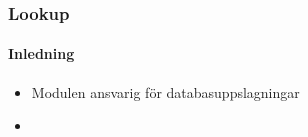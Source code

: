 \begin{frame}
  \frametitle{Lookup}
  \framesubtitle{Inledning}
  \begin{itemize}
    \item<1-> Modulen ansvarig för databasuppslagningar
    \item<2-> 
      
 \end{itemize}
\end{frame}
